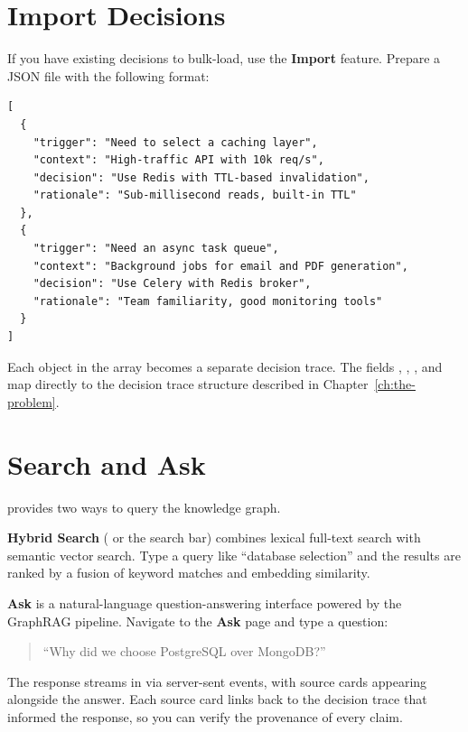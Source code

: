 \section{Import Decisions}
\label{sec:import-decisions}

If you have existing decisions to bulk-load, use the \textbf{Import} feature.
Prepare a JSON file with the following format:

\begin{lstlisting}[style=bash, numbers=none, caption={JSON format for bulk import.}]
[
  {
    "trigger": "Need to select a caching layer",
    "context": "High-traffic API with 10k req/s",
    "decision": "Use Redis with TTL-based invalidation",
    "rationale": "Sub-millisecond reads, built-in TTL"
  },
  {
    "trigger": "Need an async task queue",
    "context": "Background jobs for email and PDF generation",
    "decision": "Use Celery with Redis broker",
    "rationale": "Team familiarity, good monitoring tools"
  }
]
\end{lstlisting}

Each object in the array becomes a separate decision trace.  The fields
, , , and  map directly to
the decision trace structure described in Chapter~\ref{ch:the-problem}.


\section{Search and Ask}
\label{sec:search-and-ask}

\sysname{} provides two ways to query the knowledge graph.

\textbf{Hybrid Search} ( or the search bar) combines lexical
full-text search with semantic vector search.  Type a query like ``database
selection'' and the results are ranked by a fusion of keyword matches and
embedding similarity.

\textbf{Ask} is a natural-language question-answering interface powered by the
GraphRAG pipeline.  Navigate to the \textbf{Ask} page and type a question:

\begin{quote}
``Why did we choose PostgreSQL over MongoDB?''
\end{quote}

The response streams in via server-sent events, with source cards appearing
alongside the answer.  Each source card links back to the decision trace that
informed the response, so you can verify the provenance of every claim.

